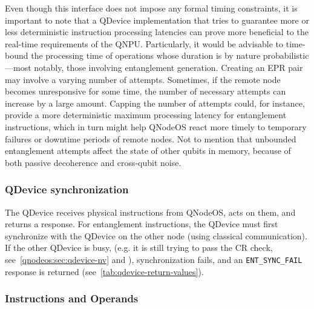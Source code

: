 Even though this interface does not impose any formal timing constraints, it is important to note that a \ac{QDevice} implementation that tries to guarantee more or less deterministic instruction processing latencies can prove more beneficial to the real-time requirements of the \ac{QNPU}. Particularly, it would be advisable to time-bound the processing time of operations whose duration is by nature probabilistic---most notably, those involving entanglement generation. Creating an \ac{EPR} pair may involve a varying number of attempts. Sometimes, if the remote node becomes unresponsive for some time, the number of necessary attempts can increase by a large amount. Capping the number of attempts could, for instance, provide a more deterministic maximum processing latency for entanglement instructions, which in turn might help \ac{QNodeOS} react more timely to temporary failures or downtime periods of remote nodes. Not to mention that unbounded entanglement attempts affect the state of other qubits in memory, because of both passive decoherence and cross-qubit noise.

\subsubsection{QDevice synchronization}
\label{qnodeos:sec:qdevice-sync}
The QDevice receives physical instructions from QNodeOS, acts on them, and returns a response. For entanglement instructions, the QDevice must first synchronize with the QDevice on the other node (using classical communication). If the other QDevice is busy, (e.g. it is still trying to pass the CR check, see~\cref{qnodeos:sec:qdevice-nv} and \cite{pompili_2022_experimental}), synchronization fails, and an \texttt{ENT\_SYNC\_FAIL} response is returned (see~\cref{tab:qdevice-return-values}).

\subsubsection{Instructions and Operands}
\label{qnodeos:sec:appendix-qdevice-instructions-operands}

